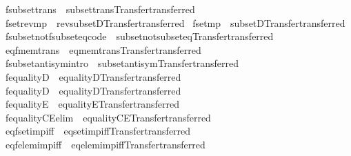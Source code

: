 \begin{isabellebody}
\isamarkupfalse%
\ fsubset{\isacharunderscore}trans\ {\isacharequal}\ subset{\isacharunderscore}trans{\isacharbrackleft}Transfer{\isachardot}transferred{\isacharbrackright}\isanewline
{}\isamarkupfalse%
\ fset{\isacharunderscore}rev{\isacharunderscore}mp\ {\isacharequal}\ rev{\isacharunderscore}subsetD{\isacharbrackleft}Transfer{\isachardot}transferred{\isacharbrackright}\isanewline
{}\isamarkupfalse%
\ fset{\isacharunderscore}mp\ {\isacharequal}\ subsetD{\isacharbrackleft}Transfer{\isachardot}transferred{\isacharbrackright}\isanewline
{}\isamarkupfalse%
\ fsubset{\isacharunderscore}not{\isacharunderscore}fsubset{\isacharunderscore}eq{\isacharbrackleft}code{\isacharbrackright}\ {\isacharequal}\ subset{\isacharunderscore}not{\isacharunderscore}subset{\isacharunderscore}eq{\isacharbrackleft}Transfer{\isachardot}transferred{\isacharbrackright}\isanewline
{}\isamarkupfalse%
\ eq{\isacharunderscore}fmem{\isacharunderscore}trans\ {\isacharequal}\ eq{\isacharunderscore}mem{\isacharunderscore}trans{\isacharbrackleft}Transfer{\isachardot}transferred{\isacharbrackright}\isanewline
{}\isamarkupfalse%
\ fsubset{\isacharunderscore}antisym{\isacharbrackleft}intro{\isacharbang}{\isacharbrackright}\ {\isacharequal}\ subset{\isacharunderscore}antisym{\isacharbrackleft}Transfer{\isachardot}transferred{\isacharbrackright}\isanewline
{}\isamarkupfalse%
\ fequalityD{}\ {\isacharequal}\ equalityD{}{\isacharbrackleft}Transfer{\isachardot}transferred{\isacharbrackright}\isanewline
{}\isamarkupfalse%
\ fequalityD{}\ {\isacharequal}\ equalityD{}{\isacharbrackleft}Transfer{\isachardot}transferred{\isacharbrackright}\isanewline
{}\isamarkupfalse%
\ fequalityE\ {\isacharequal}\ equalityE{\isacharbrackleft}Transfer{\isachardot}transferred{\isacharbrackright}\isanewline
{}\isamarkupfalse%
\ fequalityCE{\isacharbrackleft}elim{\isacharbrackright}\ {\isacharequal}\ equalityCE{\isacharbrackleft}Transfer{\isachardot}transferred{\isacharbrackright}\isanewline
{}\isamarkupfalse%
\ eqfset{\isacharunderscore}imp{\isacharunderscore}iff\ {\isacharequal}\ eqset{\isacharunderscore}imp{\isacharunderscore}iff{\isacharbrackleft}Transfer{\isachardot}transferred{\isacharbrackright}\isanewline
{}\isamarkupfalse%
\ eqfelem{\isacharunderscore}imp{\isacharunderscore}iff\ {\isacharequal}\ eqelem{\isacharunderscore}imp{\isacharunderscore}iff{\isacharbrackleft}Transfer{\isachardot}transferred{\isacharbrackright}\isanewline

\end{isabellebody}
